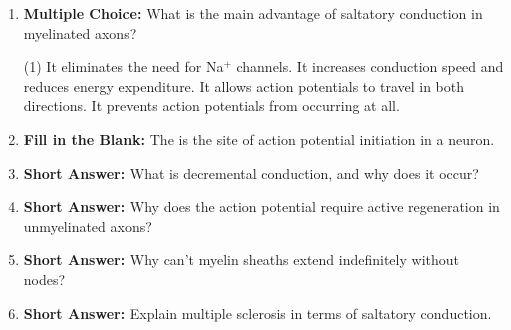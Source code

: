 \begin{enumerate}[label=\textbf{Q2.3.\arabic*}]
\newpage
      



            \item \textbf{Multiple Choice:} What is the main advantage of saltatory conduction in myelinated axons?
            \begin{tasks}[label=\textcolor{draculafg}{(\Alph*)}, item-format=\color{draculafg}, label-width=1.5em, item-indent=1.7em](1)
                  \task It eliminates the need for Na\(^+\) channels.
                  \task It increases conduction speed and reduces energy expenditure.
                  \task It allows action potentials to travel in both directions.
                  \task It prevents action potentials from occurring at all.
            \end{tasks}
            
      \item \textbf{Fill in the Blank:} The \underline{\hspace{3cm}} is the site of action potential initiation in a neuron. \\

      \item \textbf{Short Answer:} What is decremental conduction, and why does it occur? \\

      \item \textbf{Short Answer:} Why does the action potential require active regeneration in unmyelinated axons? \\

      \item \textbf{Short Answer:} Why can't myelin sheaths extend indefinitely without nodes? \\

      \item \textbf{Short Answer:} Explain multiple sclerosis in terms of saltatory conduction. \\

\end{enumerate}

